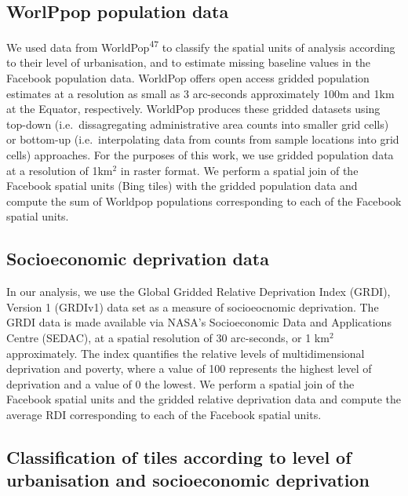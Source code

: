 \documentclass[
  11pt,
]{article}
\begin{document}
\subsection{WorlPpop population data}\label{worlppop-population-data}

We used data from WorldPop\textsuperscript{47} to classify the spatial
units of analysis according to their level of urbanisation, and to
estimate missing baseline values in the Facebook population data.
WorldPop offers open access gridded population estimates at a resolution
as small as 3 arc-seconds approximately 100m and 1km at the Equator,
respectively. WorldPop produces these gridded datasets using top-down
(i.e.~dissagregating administrative area counts into smaller grid cells)
or bottom-up (i.e.~interpolating data from counts from sample locations
into grid cells) approaches. For the purposes of this work, we use
gridded population data at a resolution of 1km\(^2\) in raster format.
We perform a spatial join of the Facebook spatial units (Bing tiles)
with the gridded population data and compute the sum of Worldpop
populations corresponding to each of the Facebook spatial units.

\subsection{Socioeconomic deprivation
data}\label{socioeconomic-deprivation-data}

In our analysis, we use the Global Gridded Relative Deprivation Index
(GRDI), Version 1 (GRDIv1) data set as a measure of socioeocnomic
deprivation. The GRDI data is made available via NASA's Socioeconomic
Data and Applications Centre (SEDAC), at a spatial resolution of 30
arc-seconds, or 1 km\(^2\) approximately. The index quantifies the
relative levels of multidimensional deprivation and poverty, where a
value of 100 represents the highest level of deprivation and a value of
0 the lowest. We perform a spatial join of the Facebook spatial units
and the gridded relative deprivation data and compute the average RDI
corresponding to each of the Facebook spatial units.

\subsection{Classification of tiles according to level of urbanisation
and socioeconomic
deprivation}\label{classification-of-tiles-according-to-level-of-urbanisation-and-socioeconomic-deprivation}
\end{document}
